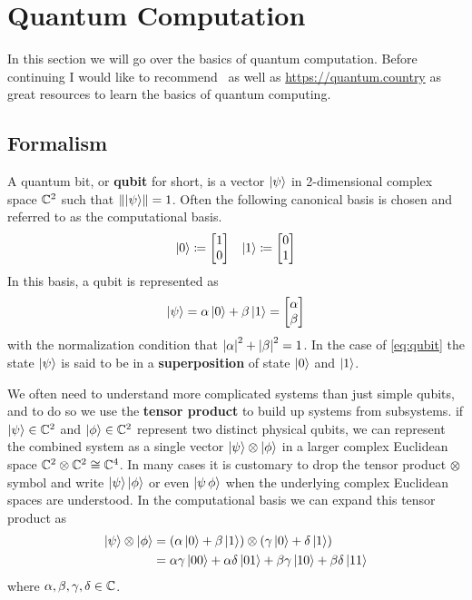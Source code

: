 
\section{Quantum Computation}

In this section we will go over the basics of quantum computation.
Before continuing I would like to recommend~\cite{nielsenchuang} as well as \url{https://quantum.country} as great resources to learn the basics of quantum computing.

\subsection{Formalism}

A quantum bit, or \textbf{qubit} for short, is a vector $\ket{\psi}$ in 2-dimensional complex space $\mathbb{C}^2$ such that $\norm{\ket{\psi}} = 1$.
Often the following canonical basis is chosen and referred to as the computational basis.
\begin{align}
    \ket{0} \defeq \mqty[1 \\ 0] & & \ket{1} \defeq \mqty[0 \\ 1]
\end{align}
In this basis, a qubit is represented as
\begin{equation}\label{eq:qubit}
    \ket{\psi} = \alpha\ket{0} + \beta\ket{1} = \mqty[\alpha \\ \beta]
\end{equation}
with the normalization condition that $\abs{\alpha}^2 + \abs{\beta}^2 = 1$.
In the case of \cref{eq:qubit} the state $\ket{\psi}$ is said to be in a \textbf{superposition} of state $\ket{0}$ and $\ket{1}$.

We often need to understand more complicated systems than just simple qubits, and to do so we use the \textbf{tensor product} to build up systems from subsystems.
\Eg{} if $\ket{\psi}\in\mathbb{C}^2$ and $\ket{\phi}\in\mathbb{C}^2$ represent two distinct physical qubits, we can represent the combined system as a single vector $\ket{\psi}\otimes \ket{\phi}$ in a larger complex Euclidean space $\mathbb{C}^2\otimes \mathbb{C}^2\cong \mathbb{C}^4$.
In many cases it is customary to drop the tensor product $\otimes$ symbol and write $\ket{\psi}\ket{\phi}$ or even $\ket{\psi \, \phi}$ when the underlying complex Euclidean spaces are understood.
In the computational basis we can expand this tensor product as
\begin{align}
    \ket{\psi}\otimes \ket{\phi} & = \qty(\alpha\ket{0} + \beta\ket{1})\otimes\qty(\gamma\ket{0} + \delta\ket{1})            \\
                                 & = \alpha\gamma\ket{00} + \alpha\delta\ket{01} + \beta\gamma\ket{10} + \beta\delta\ket{11}
\end{align}
where $\alpha, \beta, \gamma, \delta \in \mathbb{C}$.

